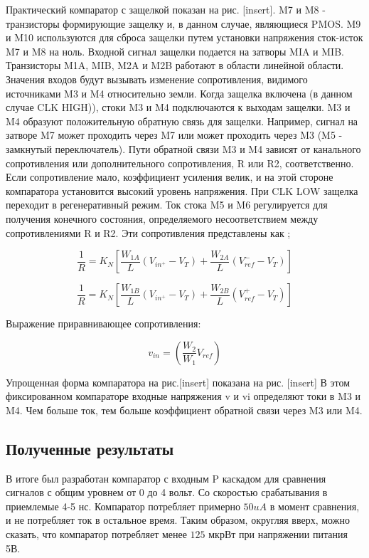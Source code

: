 \documentclass[a4paper,12pt]{article} %
\begin{document}
  Практический компаратор с защелкой показан на рис. [insert]. M7 и M8 - транзисторы формирующие защелку и, в данном случае, являющиеся PMOS. M9 и M10 используются для сброса защелки путем установки напряжения сток-исток M7 и M8 на ноль. Входной сигнал защелки подается на затворы MIA и MIB. Транзисторы M1A, MIB, M2A и M2B работают в области линейной области. Значения входов будут вызывать изменение сопротивления, видимого источниками M3 и M4 относительно земли. Когда защелка включена (в данном случае CLK HIGH)), стоки M3 и M4 подключаются к  выходам защелки. M3 и M4 образуют положительную обратную связь для защелки. Например, сигнал на затворе M7 может проходить через M7 или может проходить через M3 (M5 - замкнутый переключатель).  Пути обратной связи M3 и M4 зависят от канального сопротивления  или дополнительного сопротивления, R или R2, соответственно. Если сопротивление мало, коэффициент усиления велик, и на этой стороне компаратора установится высокий уровень напряжения.  При CLK LOW защелка переходит в регенеративный режим.  Ток стока M5 и M6 регулируется для получения конечного состояния, определяемого несоответствием между сопротивлениями R и R2.  Эти сопротивления представлены как ; 



\begin{equation}
    \frac{1}{R} = K_N [ \frac{W_{ 1 A}}{L}(V_{in^+} - V_T) + \frac{W_{ 2 A }}{L}(V_{ref}^- - V_T) ]
\end{equation}


\begin{equation}
    \frac{1}{R} = K_N [ \frac{W_{ 1 B}}{L}(V_{in^+} - V_T) + \frac{W_{ 2 B }}{L}(V_{ref}^+ - V_T) ]
\end{equation}

Выражение приравнивающее сопротивления:

$$ v_{in} = ( \frac{W_2}{W_1}V_{ref}) $$



Упрощенная форма компаратора на рис.[insert] показана на рис. [insert] В этом фиксированном компараторе входные напряжения v и vi определяют токи в M3 и M4.  Чем больше ток, тем больше коэффициент обратной связи через M3 или M4.   

\subsection{Полученные результаты }


В итоге был разработан компаратор с входным P каскадом для сравнения сигналов с общим уровнем от 0 до 4 вольт. Со скоростью срабатывания в приемлемые 4-5 нс. Компаратор потребляет примерно $50uA$ в момент сравнения, и не потребляет ток в остальное время. Таким образом, округляя вверх, можно сказать, что компаратор потребляет менее  $125$ мкрВт при  напряжении питания 5В.
\end{document}
